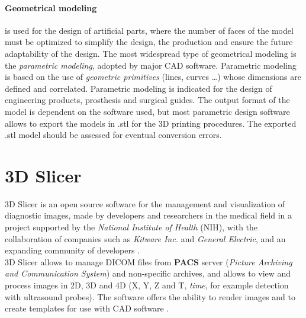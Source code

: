 \paragraph{Geometrical modeling} is used for the design of artificial parts, where the number of faces of the model must be optimized to simplify the design, the production and ensure the future adaptability of the design. The most widespread type of geometrical modeling is the \emph{parametric modeling}, adopted by major CAD software. Parametric modeling is based on the use of \emph{geometric primitives} (lines, curves \ldots) whose dimensions are defined and correlated. Parametric modeling is indicated for the design of engineering products, prosthesis and surgical guides. The output format of the model is dependent on the software used, but most parametric design software allows to export the models in .stl for the 3D printing procedures. The exported .stl model should be assessed for eventual conversion errors.

\section{3D Slicer}
3D Slicer is an open source software for the management and visualization of diagnostic images, made by developers and researchers in the medical field in a project supported by the \emph{National Institute of Health} (NIH), with the collaboration of companies such as \emph{Kitware Inc.} and \emph{General Electric}, and an expanding community of developers \parencite{Reference28}. \\
3D Slicer allows to manage DICOM files from \textbf{PACS} server (\emph{Picture Archiving and Communication System}) and non-specific archives, and allows to view and process images in 2D, 3D and 4D (X, Y, Z and T, \emph{time}, for example detection with ultrasound probes). The software offers the ability to render images and to create templates for use with CAD software \parencite{Reference31}.\\

